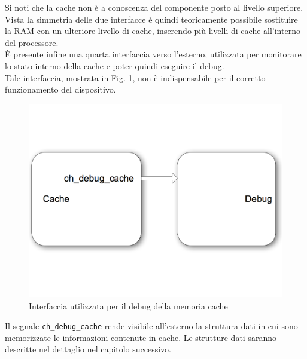 Si noti che la cache non \`e a conoscenza del componente posto al livello superiore. Vista la simmetria delle due interfacce \`e quindi teoricamente possibile sostituire la RAM con un ulteriore livello di cache, inserendo pi\`u livelli di cache all'interno del processore.\\


\`E presente infine una quarta interfaccia verso l'esterno, utilizzata per monitorare lo stato interno della cache e poter quindi eseguire il debug.\\
Tale interfaccia, mostrata in Fig. \ref{fig:int_deb}, non \`e indispensabile per il corretto funzionamento del dispositivo.

\begin{figure}[h!]
\centering
\includegraphics[width=\textwidth]{img/cache/debug.png}
\caption{Interfaccia utilizzata per il debug della memoria cache}
\label{fig:int_deb}
\end{figure}

Il segnale \texttt{ch\_debug\_cache} rende visibile all'esterno la struttura dati in cui sono memorizzate le informazioni contenute in cache. Le strutture dati saranno descritte nel dettaglio nel capitolo successivo.













